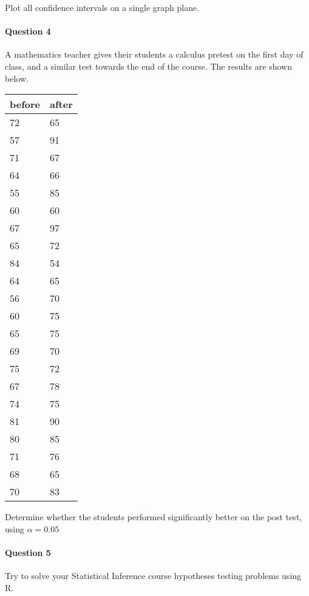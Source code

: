 \documentclass[]{article}
\let\oldparagraph\paragraph
\renewcommand{\paragraph}[1]{\oldparagraph{#1}\mbox{}}
\begin{document}
Plot all confidence intervals on a single graph plane.

\hypertarget{question-4}{%
\paragraph{Question 4}\label{question-4}}

A mathematics teacher gives their students a calculus pretest on the
first day of class, and a similar test towards the end of the course.
The results are shown below.

\begin{longtable}[]{@{}ll@{}}
\toprule
before & after\tabularnewline
\midrule
\endhead
72 & 65\tabularnewline
57 & 91\tabularnewline
71 & 67\tabularnewline
64 & 66\tabularnewline
55 & 85\tabularnewline
60 & 60\tabularnewline
67 & 97\tabularnewline
65 & 72\tabularnewline
84 & 54\tabularnewline
64 & 65\tabularnewline
56 & 70\tabularnewline
60 & 75\tabularnewline
65 & 75\tabularnewline
69 & 70\tabularnewline
75 & 72\tabularnewline
67 & 78\tabularnewline
74 & 75\tabularnewline
81 & 90\tabularnewline
80 & 85\tabularnewline
71 & 76\tabularnewline
68 & 65\tabularnewline
70 & 83\tabularnewline
\bottomrule
\end{longtable}

Determine whether the students performed significantly better on the
post test, using \(\alpha=0.05\)

\hypertarget{question-5}{%
\paragraph{Question 5}\label{question-5}}

Try to solve your Statistical Inference course hypotheses testing
problems using R.
\end{document}
